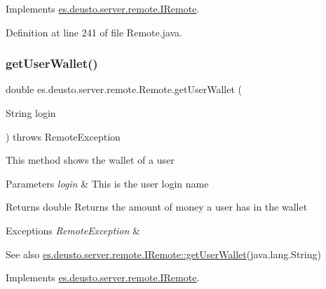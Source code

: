 Implements \hyperlink{interfacees_1_1deusto_1_1server_1_1remote_1_1_i_remote_a90995befbd81e0781056f75645997fe9}{es.\+deusto.\+server.\+remote.\+I\+Remote}.



Definition at line 241 of file Remote.\+java.

\mbox{\label{classes_1_1deusto_1_1server_1_1remote_1_1_remote_af7cc190cccf69cda838a6d9805c5c2f5}} 
\subsubsection{\texorpdfstring{get\+User\+Wallet()}{getUserWallet()}}
{\footnotesize\ttfamily double es.\+deusto.\+server.\+remote.\+Remote.\+get\+User\+Wallet (\begin{DoxyParamCaption}\item[{String}]{login }\end{DoxyParamCaption}) throws Remote\+Exception}

This method shows the wallet of a user 
\begin{DoxyParams}{Parameters}
{\em login} & This is the user login name \\
\hline
\end{DoxyParams}
\begin{DoxyReturn}{Returns}
double Returns the amount of money a user has in the wallet 
\end{DoxyReturn}

\begin{DoxyExceptions}{Exceptions}
{\em Remote\+Exception} & \\
\hline
\end{DoxyExceptions}
\begin{DoxySeeAlso}{See also}
\hyperlink{interfacees_1_1deusto_1_1server_1_1remote_1_1_i_remote_a53305dbc72d910c932e66e2c27c5e1bb}{es.\+deusto.\+server.\+remote.\+I\+Remote\+::get\+User\+Wallet}(java.\+lang.\+String) 
\end{DoxySeeAlso}


Implements \hyperlink{interfacees_1_1deusto_1_1server_1_1remote_1_1_i_remote_a53305dbc72d910c932e66e2c27c5e1bb}{es.\+deusto.\+server.\+remote.\+I\+Remote}.



